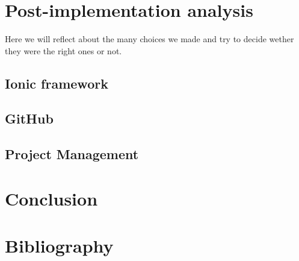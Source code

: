 \documentclass[12pt]{article} %
\begin{document}
\section{Post-implementation analysis}

Here we will reflect about the many choices we made and try to decide wether they were the right ones or not.

\subsection{Ionic framework}

\subsection{GitHub}

\subsection{Project Management}


\section{Conclusion} 

\section{Bibliography}
\end{document}
